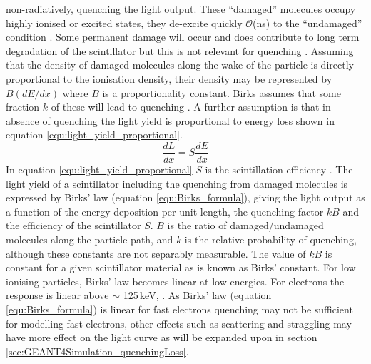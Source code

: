 non-radiatively, quenching the light output. These “damaged” molecules occupy highly ionised or excited states, they de-excite quickly $\mathcal{O}$(ns) to the “undamaged” condition \cite{knoll_2010}. Some permanent damage will occur and does contribute to long term degradation of the scintillator but this is not relevant for quenching \cite{knoll_2010}. Assuming that the density of damaged molecules along the wake of the particle is directly proportional to the ionisation density, their density may be represented by $B(dE/dx)$ where $B$ is a proportionality constant. Birks assumes that some fraction $k$ of these will lead to quenching \cite{craun_1970}. A further assumption is that in absence of quenching the light yield is proportional to energy loss shown in equation \ref{equ:light_yield_proportional}.
\begin{equation}
\frac{dL}{dx} = S\frac{dE}{dx}
\label{equ:light_yield_proportional}
\end{equation}
In equation \ref{equ:light_yield_proportional} $S$ is the scintillation efficiency \cite{birks_1964}. The light yield of a scintillator including the quenching from damaged molecules is expressed by Birks' law (equation \ref{equ:Birks_formula}), giving the light output as a function of the energy deposition per unit length, the quenching factor $kB$ and the efficiency of the scintillator $S$. $B$ is the ratio of damaged/undamaged molecules along the particle path, and $k$ is the relative probability of quenching, although these constants are not separably measurable. The value of $kB$ is constant for a given scintillator material as is known as Birks' constant. For low ionising particles, Birks' law becomes linear at low energies. For electrons the response is linear above $\sim$ 125\,keV, \cite{craun_1970}. As Birks' law (equation \ref{equ:Birks_formula}) is linear for fast electrons \cite{knoll_2010} quenching may not be sufficient for modelling fast electrons, other effects such as scattering and straggling may have more effect on the light curve as will be expanded upon in section \ref{sec:GEANT4Simulation_quenchingLoss}. 
